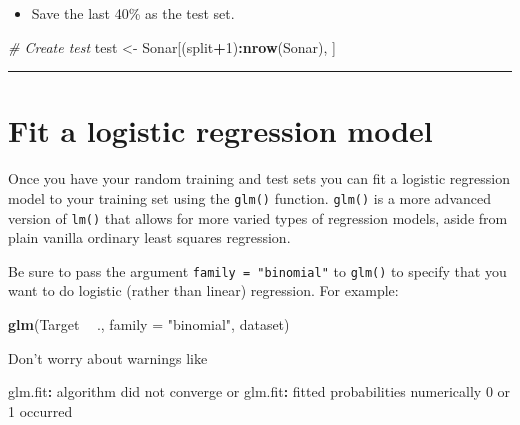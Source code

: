 \documentclass[]{book}
\newenvironment{Shaded}{\begin{snugshade}}{\end{snugshade}}
\newcommand{\KeywordTok}[1]{\textcolor[rgb]{0.13,0.29,0.53}{\textbf{#1}}}
\newcommand{\DataTypeTok}[1]{\textcolor[rgb]{0.13,0.29,0.53}{#1}}
\newcommand{\DecValTok}[1]{\textcolor[rgb]{0.00,0.00,0.81}{#1}}
\newcommand{\StringTok}[1]{\textcolor[rgb]{0.31,0.60,0.02}{#1}}
\newcommand{\CommentTok}[1]{\textcolor[rgb]{0.56,0.35,0.01}{\textit{#1}}}
\newcommand{\OperatorTok}[1]{\textcolor[rgb]{0.81,0.36,0.00}{\textbf{#1}}}
\newcommand{\NormalTok}[1]{#1}
\providecommand{\tightlist}{%
  \setlength{\itemsep}{0pt}\setlength{\parskip}{0pt}}
\begin{document}
\begin{itemize}
\tightlist
\item
  Save the last 40\% as the test set.
\end{itemize}

\begin{Shaded}
\begin{Highlighting}[]
\CommentTok{# Create test}
\NormalTok{test <-}\StringTok{ }\NormalTok{Sonar[(split}\OperatorTok{+}\DecValTok{1}\NormalTok{)}\OperatorTok{:}\KeywordTok{nrow}\NormalTok{(Sonar), ]}
\end{Highlighting}
\end{Shaded}

\begin{center}\rule{0.5\linewidth}{\linethickness}\end{center}

\section{Fit a logistic regression
model}\label{fit-a-logistic-regression-model}

Once you have your random training and test sets you can fit a logistic
regression model to your training set using the \texttt{glm()} function.
\texttt{glm()} is a more advanced version of \texttt{lm()} that allows
for more varied types of regression models, aside from plain vanilla
ordinary least squares regression.

Be sure to pass the argument \texttt{family\ =\ "binomial"} to
\texttt{glm()} to specify that you want to do logistic (rather than
linear) regression. For example:

\begin{Shaded}
\begin{Highlighting}[]
\KeywordTok{glm}\NormalTok{(Target }\OperatorTok{~}\StringTok{ }\NormalTok{., }\DataTypeTok{family =} \StringTok{"binomial"}\NormalTok{, dataset)}
\end{Highlighting}
\end{Shaded}

Don't worry about warnings like

\begin{Shaded}
\begin{Highlighting}[]
\NormalTok{glm.fit}\OperatorTok{:}\StringTok{ }\NormalTok{algorithm did not converge or glm.fit}\OperatorTok{:}\StringTok{ }\NormalTok{fitted probabilities numerically }\DecValTok{0}\NormalTok{ or }\DecValTok{1}\NormalTok{ occurred}
\end{Highlighting}
\end{Shaded}
\end{document}
